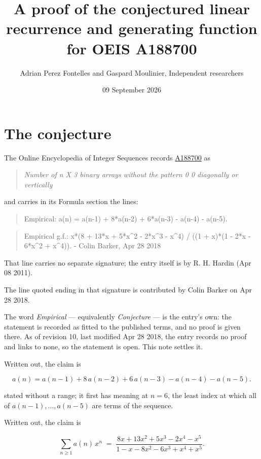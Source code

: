 \documentclass[11pt]{article}
\title{A proof of the conjectured linear recurrence and generating function for OEIS A188700}
\author{Adrian Perez Fontelles and Gaspard Moulinier, Independent researchers}
\date{09 September 2026}
\theoremstyle{definition}
\begin{document}
\maketitle
\section{The conjecture}

The Online Encyclopedia of Integer Sequences records \href{https://oeis.org/A188700}{A188700} as

\begin{quote}\itshape Number of n X 3 binary arrays without the pattern 0 0 diagonally or vertically\end{quote}

and carries in its Formula section the lines:

\begin{quote}\ttfamily Empirical: a(n) = a(n-1) + 8*a(n-2) + 6*a(n-3) - a(n-4) - a(n-5).\end{quote}

\begin{quote}\ttfamily Empirical g.f.: x*(8 + 13*x + 5*x\textasciicircum{}2 - 2*x\textasciicircum{}3 - x\textasciicircum{}4) / ((1 + x)*(1 - 2*x - 6*x\textasciicircum{}2 + x\textasciicircum{}4)). - Colin Barker, Apr 28 2018\end{quote}

That line carries no separate signature; the entry itself is by R. H. Hardin (Apr 08 2011).

The line quoted ending in that signature is contributed by Colin Barker on Apr 28 2018.

The word {\itshape Empirical} --- equivalently {\itshape Conjecture} --- is the entry's own: the statement is recorded as fitted to the published terms, and no proof is given there. As of revision 10, last modified Apr 28 2018, the entry records no proof and links to none, so the statement is open. This note settles it.

Written out, the claim is

\[a(n) = a(n-1) + 8\,a(n-2) + 6\,a(n-3) - a(n-4) - a(n-5).\]

stated without a range; it first has meaning at $n = 6$, the least index at which all of $a(n-1),\dots,a(n-5)$ are terms of the sequence.

Written out, the claim is

\[\sum_{n \ge 1} a(n)\,x^n \;=\; \frac{8x + 13x^{2} + 5x^{3} - 2x^{4} - x^{5}}{1 - x - 8x^{2} - 6x^{3} + x^{4} + x^{5}}.\]
\end{document}
